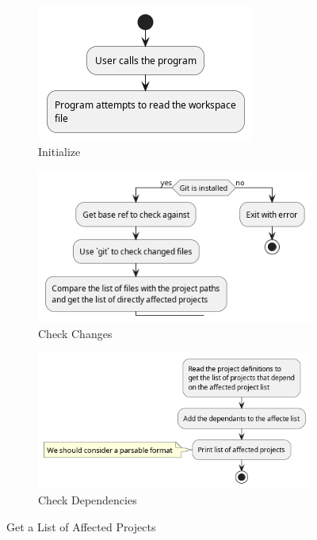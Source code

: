 \documentclass[11pt]{article}
\begin{document}
\begin{figure}[htbp]
  \centering
  \begin{subfigure}{0.45\linewidth}
    \includegraphics[width=\linewidth]{diags/get_affected_activity.png}
    \caption{Initialize}
  \end{subfigure}
  \begin{subfigure}{0.45\linewidth}
    \includegraphics[width=\linewidth]{diags/get_affected_activity_001.png}
    \caption{Check Changes}
  \end{subfigure}
  \begin{subfigure}{0.5\linewidth}
    \includegraphics[width=\linewidth]{diags/get_affected_activity_002.png}
    \caption{Check Dependencies}
  \end{subfigure}
  \caption{\label{fig:act_aff}Get a List of Affected Projects}
\end{figure}
\end{document}

